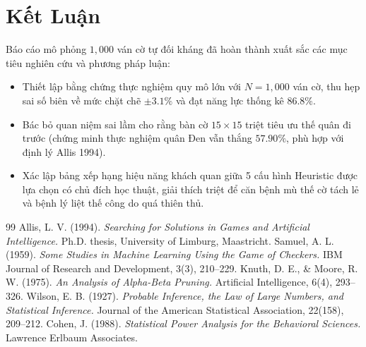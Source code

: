 \documentclass[11pt,a4paper]{article}
\begin{document}
\section{Kết Luận}

Báo cáo mô phỏng $1{,}000$ ván cờ tự đối kháng đã hoàn thành xuất sắc các mục tiêu nghiên cứu và phương pháp luận:
\begin{itemize}
    \item Thiết lập bằng chứng thực nghiệm quy mô lớn với $N = 1{,}000$ ván cờ, thu hẹp sai số biên về mức chặt chẽ $\pm 3.1\%$ và đạt năng lực thống kê $86.8\%$.
    \item Bác bỏ quan niệm sai lầm cho rằng bàn cờ $15 \times 15$ triệt tiêu ưu thế quân đi trước (chứng minh thực nghiệm quân Đen vẫn thắng $57.90\%$, phù hợp với định lý Allis 1994).
    \item Xác lập bảng xếp hạng hiệu năng khách quan giữa 5 cấu hình Heuristic được lựa chọn có chủ đích học thuật, giải thích triệt để căn bệnh mù thế cờ tách lẻ và bệnh lý liệt thế công do quá thiên thủ.
\end{itemize}

\begin{thebibliography}{99}
 Allis, L. V. (1994). \textit{Searching for Solutions in Games and Artificial Intelligence.} Ph.D. thesis, University of Limburg, Maastricht.
 Samuel, A. L. (1959). \textit{Some Studies in Machine Learning Using the Game of Checkers.} IBM Journal of Research and Development, 3(3), 210--229.
 Knuth, D. E., \& Moore, R. W. (1975). \textit{An Analysis of Alpha-Beta Pruning.} Artificial Intelligence, 6(4), 293--326.
 Wilson, E. B. (1927). \textit{Probable Inference, the Law of Large Numbers, and Statistical Inference.} Journal of the American Statistical Association, 22(158), 209--212.
 Cohen, J. (1988). \textit{Statistical Power Analysis for the Behavioral Sciences.} Lawrence Erlbaum Associates.
\end{thebibliography}
\end{document}
